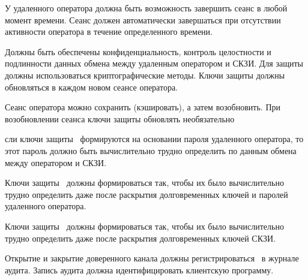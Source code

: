 \label{R.TC.Logout} %
У удаленного оператора должна быть возможность завершить сеанс в любой момент 
времени. Сеанс должен автоматически завершаться при отсутствии активности 
оператора в течение определенного времени.

\label{R.TC.Crypto} %
Должны быть обеспечены конфиденциальность, контроль целостности и подлинности 
данных обмена между удаленным оператором и СКЗИ.
%
Для защиты должны использоваться криптографические методы.
%
Ключи защиты должны обновляться в каждом новом сеансе оператора.

\begin{note*}
Сеанс оператора можно сохранить (кэшировать), а затем возобновить.
При возобновлении сеанса ключи защиты обновлять необязательно
\end{note*}

%

\label{R.TC.Pwd} %
сли ключи защиты~ формируются на основании 
пароля удаленного оператора, то этот пароль должно быть вычислительно
трудно определить по данным обмена между оператором и СКЗИ.

\label{R.TC.FSWeak} %
Ключи защиты~ должны формироваться так, чтобы их было
вычислительно трудно определить даже после раскрытия долговременных ключей и
паролей удаленного оператора.

\label{R.TC.FS} %
Ключи защиты~ должны формироваться так, чтобы их было
вычислительно трудно определить даже после раскрытия долговременных ключей СКЗИ.

\label{R.TC.AU} %
Открытие и закрытие доверенного канала должны регистрироваться~ 
в журнале аудита. Запись аудита должна идентифицировать клиентскую программу.

